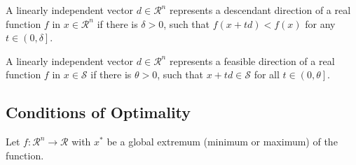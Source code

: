 \begin{itemize}
\begin{defn} A linearly independent vector $d\in\mathcal{R}^{n}$ represents a descendant direction of a real function $f$ in $x\in\mathcal{R}^{n}$ if there is $\delta>0$, such that $f\left(x+t d\right)<f\left(x\right)$ for any $t\in\left.\left(0,\delta\right.\right]$.   
\end{defn}

\begin{defn} A linearly independent vector $d\in\mathcal{R}^{n}$ represents a feasible direction of a real function $f$ in $x\in\mathcal{S}$ if there is $\theta >0$, such that $x+t d\in \mathcal{S}$ for all $t\in\left.\left(0,\theta\right.\right]$.   
\end{defn}

\end{itemize}

\subsection{Conditions of Optimality}\label{Chapter:GlobalOpt:Section:ConditionsOptimality}
Let $f:\mathcal{R}^{n}\rightarrow\mathcal{R}$ with $x^{\ast}$ be a global extremum (minimum or maximum) of the function.


